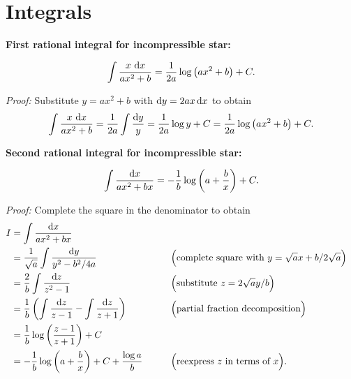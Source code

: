 

\chapter{Integrals}
\label{chap:integrals}

\newcommand\formulawithcomment[4]{%
\textbf{#1:}
#2
\textit{#3:} #4
}

\newcommand\formulawithproof[3]{\formulawithcomment{#1}{#2}{Proof}{#3}}
\newcommand\formulawithreference[3]{\formulawithcomment{#1}{#2}{Reference}{#3}}

\formulawithproof{First rational integral for incompressible star}{
\begin{equation}
	\int \frac{x \, \mathop{}\!\mathrm{d} x}{ax^2 + b} = \frac{1}{2a} \log \left( a x^2 + b \right) + C .
	\label{eq:integrals:logarithm_xnum}
\end{equation}
}{
	Substitute $y = a x^2 + b$ with $\mathop{}\!\mathrm{d} y = 2 a x \mathop{}\!\mathrm{d} x$ to obtain
	\begin{equation*}
		\int \frac{x \, \mathop{}\!\mathrm{d} x}{ax^2 + b} = \frac{1}{2a} \int \frac{\mathop{}\!\mathrm{d} y}{y} = \frac{1}{2a} \log y + C = \frac{1}{2a} \log \left( a x^2 + b \right) + C .
	\end{equation*}
}

\bigskip

\formulawithproof{Second rational integral for incompressible star}{
\begin{equation}
	\int \frac{\mathop{}\!\mathrm{d} x}{ax^2 + bx} = -\frac{1}{b} \log \left( a + \frac{b}{x} \right) + C .
	\label{eq:integrals:logarithm_1num}
\end{equation}
}{
	Complete the square in the denominator to obtain
	\begin{align*}
		I &= \int \frac{\mathop{}\!\mathrm{d} x}{ax^2 + bx} \\
		  &= \frac{1}{\sqrt{a}} \int \frac{\mathop{}\!\mathrm{d} y}{y^2 - b^2 / 4a} & \qquad & \Big( \text{complete square with } y = \sqrt{a} x + b / 2 \sqrt{a} \Big) \\
		  &= \frac{2}{b} \int \frac{\mathop{}\!\mathrm{d} z}{z^2 - 1} & \qquad & \Big( \text{substitute } z = 2 \sqrt{a} y / b \Big) \\
		  &= \frac{1}{b} \left( \int \frac{\mathop{}\!\mathrm{d} z}{z-1} - \int \frac{\mathop{}\!\mathrm{d} z}{z+1} \right) & \qquad & \Big( \text{partial fraction decomposition} \Big) \\
		  &= \frac{1}{b} \log \left( \frac{z-1}{z+1} \right) + C \\
		  &= -\frac{1}{b} \log \left( a + \frac{b}{x} \right) + C + \frac{\log a}{b} & \qquad & \Big( \text{reexpress $z$ in terms of $x$} \Big) .
	\end{align*}
}

